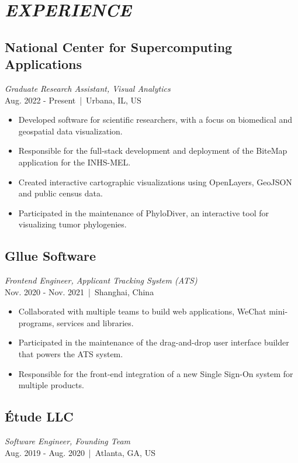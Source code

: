 \documentclass[11pt]{article}
\begin{document}
\begin{minipage}{270pt}

\section*{\it EXPERIENCE}

\subsection*{National Center for Supercomputing Applications}
\textit{Graduate Research Assistant, Visual Analytics} \\
Aug. 2022 - Present \,|\, Urbana, IL, US

\begin{itemize}
\item Developed software for scientific researchers, with a focus on biomedical and geospatial data visualization.
\item Responsible for the full-stack development and deployment of the BiteMap application for the INHS-MEL.
\item Created interactive cartographic visualizations using OpenLayers, GeoJSON and public census data.
\item Participated in the maintenance of PhyloDiver, an interactive tool for visualizing tumor phylogenies.
\end{itemize}

\subsection*{Gllue Software}
\textit{Frontend Engineer, Applicant Tracking System (ATS)}\\
Nov. 2020 - Nov. 2021 \,|\, Shanghai, China

\begin{itemize}
\item Collaborated with multiple teams to build web applications, WeChat mini-programs, services and libraries.
\item Participated in the maintenance of the drag-and-drop user interface builder that powers the ATS system.
\item Responsible for the front-end integration of a new Single Sign-On system for multiple products.
\end{itemize}

\subsection*{Étude LLC}
\textit{Software Engineer, Founding Team}\\
Aug. 2019 - Aug. 2020 \,|\,  Atlanta, GA, US


\end{minipage}
\end{document}
